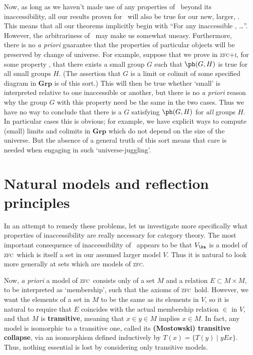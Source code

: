 \documentclass[12pt]{amsart}
\def\zfc{\textsc{zfc}}
\def\zfci{\textsc{zfc+i}}
\begin{document}
Now, as long as we haven't made use of any properties of \ka\ beyond
its inaccessibility, all our results proven for \ka\ will also be true
for our new, larger, \ka.  This means that all our theorems implicitly
begin with ``For any inaccessible \ka, \dots''.  However, the
arbitrariness of \ka\ may make us somewhat uneasy.  Furthermore, there
is no \emph{a priori} guarantee that the properties of particular
objects will be preserved by change of universe.  For example, suppose
that we prove in \zfci, for some property \ph, that there exists a
small group $G$ such that $\ph(G,H)$ is true for all small groups $H$.
(The assertion that $G$ is a limit or colimit of some specified
diagram in $\mathbf{Grp}$ is of this sort.)  This will then be true
whether `small' is interpreted relative to one inaccessible or
another, but there is no \emph{a priori} reason why the group $G$ with
this property need be the same in the two cases.  Thus we have no way
to conclude that there is a $G$ satisfying $\ph(G,H)$ for \emph{all}
groups $H$.  In particular cases this is obvious; for example, we have
explicit ways to compute (small) limits and colimits in $\mathbf{Grp}$
which do not depend on the size of the universe.  But the absence of a
general truth of this sort means that care is needed when engaging in
such `universe-juggling'.


\section{Natural models and reflection principles}
\label{sec:nmod-refl}

In an attempt to remedy these problems, let us investigate more
specifically what properties of inaccessibility are really necessary
for category theory.  The most important consequence of
inaccessibility of \ka\ appears to be that $V_\ka$ is a model of \zfc\
which is itself a set in our assumed larger model $V$.  Thus it is
natural to look more generally at sets which are models of \zfc.

Now, \emph{a priori} a model of \zfc\ consists only of a set $M$ and a
relation $E\subset M\times M$, to be interpreted as `membership', such
that the axioms of \zfc\ hold.  However, we want the elements of a set
in $M$ to be the same as its elements in $V$, so it is natural to
require that $E$ coincides with the actual membership relation $\in$
in $V$, and that $M$ is \textbf{transitive}, meaning that $x\in y\in
M$ implies $x\in M$.  In fact, any model is isomorphic to a transitive
one, called its \textbf{(Mostowski) transitive collapse}, via an
isomorphism defined inductively by $T(x) = \{T(y) \mid yEx\}$.  Thus,
nothing essential is lost by considering only transitive models.
\end{document}

